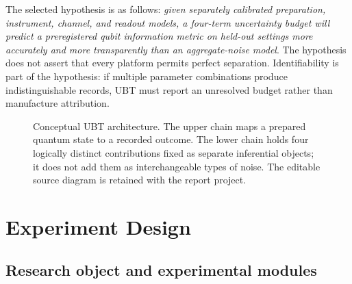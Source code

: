 \documentclass[conference]{../../../../Conference-LaTeX-template_10-17-19/IEEEtran}
\begin{document}
The selected hypothesis is as follows: \emph{given separately calibrated preparation, instrument, channel, and readout models, a four-term uncertainty budget will predict a preregistered qubit information metric on held-out settings more accurately and more transparently than an aggregate-noise model}. The hypothesis does not assert that every platform permits perfect separation. Identifiability is part of the hypothesis: if multiple parameter combinations produce indistinguishable records, UBT must report an unresolved budget rather than manufacture attribution.

\begin{figure}[!t]
\centering
{}
\caption{Conceptual UBT architecture. The upper chain maps a prepared quantum state to a recorded outcome. The lower chain holds four logically distinct contributions fixed as separate inferential objects; it does not add them as interchangeable types of noise. The editable source diagram is retained with the report project.}
\label{fig:ubt}
\end{figure}

\section{Experiment Design}

\subsection{Research object and experimental modules}
\end{document}
